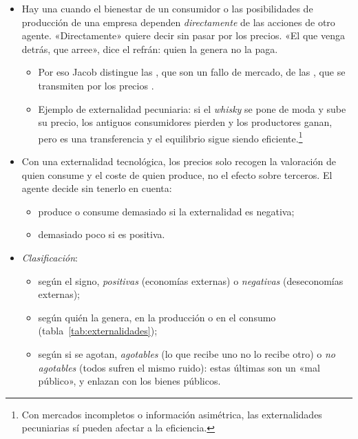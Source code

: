 \documentclass[11pt]{article}
\begin{document}
\begin{itemize}
\item Hay una  cuando el bienestar de un consumidor o las posibilidades de producción de una empresa dependen \emph{directamente} de las acciones de otro agente\nocite{MasColellWhinstonGreen1995}. «Directamente» quiere decir sin pasar por los precios. «El que venga detrás, que arree», dice el refrán: quien la genera no la paga.
  \begin{itemize}
  \item Por eso Jacob \textcite{Viner1931Cost} distingue las , que son un fallo de mercado, de las , que se transmiten por los precios\nocite{Scitovsky1954Two} .
  \item Ejemplo de externalidad pecuniaria: si el \emph{whisky} se pone de moda y sube su precio, los antiguos consumidores pierden y los productores ganan, pero es una transferencia y el equilibrio sigue siendo eficiente.\footnote{Con mercados incompletos o información asimétrica, las externalidades pecuniarias sí pueden afectar a la eficiencia\nocite{GreenwaldStiglitz1986Externalities}.}
  \end{itemize}
\item Con una externalidad tecnológica, los precios solo recogen la valoración de quien consume y el coste de quien produce, no el efecto sobre terceros. El agente decide sin tenerlo en cuenta:
  \begin{itemize}
  \item produce o consume demasiado si la externalidad es negativa;
  \item demasiado poco si es positiva.
  \end{itemize}
\item \emph{Clasificación}:
  \begin{itemize}
  \item según el signo, \emph{positivas} (economías externas) o \emph{negativas} (deseconomías externas);
  \item según quién la genera, en la producción o en el consumo (tabla~\ref{tab:externalidades});
  \item según si se agotan, \emph{agotables} (lo que recibe uno no lo recibe otro) o \emph{no agotables} (todos sufren el mismo ruido): estas últimas son un «mal público»\nocite{BaumolOates1988Theory}, y enlazan con los bienes públicos.
  \end{itemize}
\end{itemize}
\end{document}
